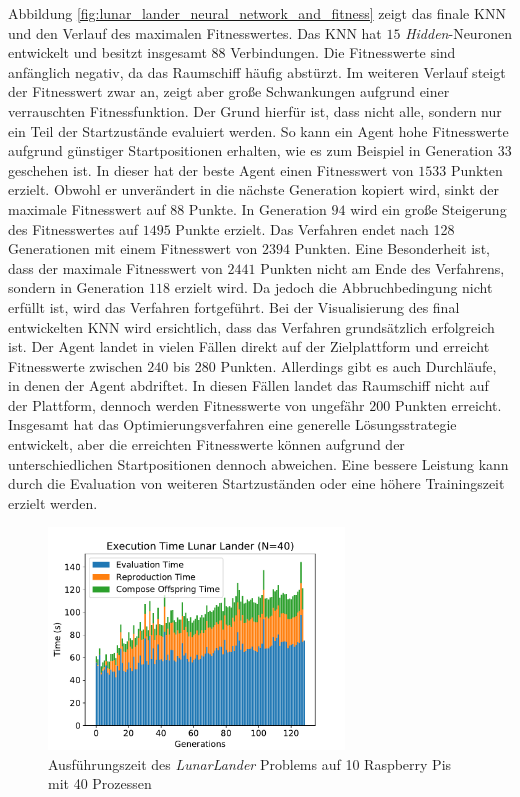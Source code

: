 Abbildung \ref{fig:lunar_lander_neural_network_and_fitness} zeigt das finale \ac{KNN} und den Verlauf des maximalen Fitnesswertes. Das \ac{KNN} hat $15$ \emph{Hidden}-Neuronen entwickelt und besitzt insgesamt $88$ Verbindungen. Die Fitnesswerte sind anfänglich negativ, da das Raumschiff häufig abstürzt. Im weiteren Verlauf steigt der Fitnesswert zwar an, zeigt aber große Schwankungen aufgrund einer verrauschten Fitnessfunktion. Der Grund hierfür ist, dass nicht alle, sondern nur ein Teil der Startzustände evaluiert werden. So kann ein Agent hohe Fitnesswerte aufgrund günstiger Startpositionen erhalten, wie es zum Beispiel in Generation $33$ geschehen ist. In dieser hat der beste Agent einen Fitnesswert von $1533$ Punkten erzielt. Obwohl er unverändert in die nächste Generation kopiert wird, sinkt der maximale Fitnesswert auf $88$ Punkte. In Generation $94$ wird ein große Steigerung des Fitnesswertes auf $1495$ Punkte erzielt. Das Verfahren endet nach 128 Generationen mit einem Fitnesswert von $2394$ Punkten. Eine Besonderheit ist, dass der maximale Fitnesswert von $2441$ Punkten nicht am Ende des Verfahrens, sondern in Generation $118$ erzielt wird. 
Da jedoch die Abbruchbedingung nicht erfüllt ist, wird das Verfahren fortgeführt. Bei der Visualisierung des final entwickelten \ac{KNN} wird ersichtlich, dass das Verfahren grundsätzlich erfolgreich ist. Der Agent landet in vielen Fällen direkt auf der Zielplattform und erreicht Fitnesswerte zwischen $240$ bis $280$ Punkten. Allerdings gibt es auch Durchläufe, in denen der Agent abdriftet. In diesen Fällen landet das Raumschiff nicht auf der Plattform, dennoch werden Fitnesswerte von ungefähr $200$ Punkten erreicht. Insgesamt hat das Optimierungsverfahren eine generelle Lösungsstrategie entwickelt, aber die erreichten Fitnesswerte können aufgrund der unterschiedlichen Startpositionen dennoch abweichen. Eine bessere Leistung kann durch die Evaluation von weiteren Startzuständen oder eine höhere Trainingszeit erzielt werden.
\begin{figure}[!h]
	\centering
	\includegraphics[width=0.7\textwidth]{./img/lunar_lander/lunar_lander_time_40.pdf} 
	\caption{Ausführungszeit des \emph{LunarLander} Problems auf 10 Raspberry Pis mit 40 Prozessen}
	\label{fig:lunar_lander_time_40core_10pi}
\end{figure}
